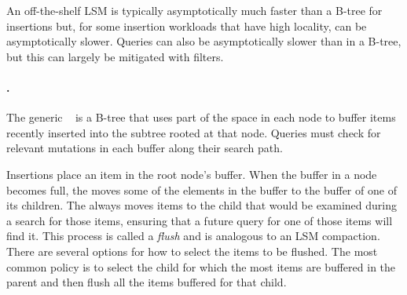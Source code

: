 


An off-the-shelf LSM is typically
asymptotically much faster than a B-tree for insertions but, for some
insertion workloads that have high locality, can be asymptotically slower.  Queries can also be
asymptotically slower than in a B-tree, but this can largely be
mitigated with filters.

\paragraph{\Bets.} The generic \bet~\cite{DBLP:conf/soda/BrodalF03}
is
a B-tree that uses part of the space in each node to buffer items
recently inserted into the subtree rooted at that node.  Queries must
check for relevant mutations in each buffer along their search path.

Insertions place an item in the root node's buffer.  When the buffer
in a node becomes full, the \bet moves some of the
elements in the buffer to the buffer of one of its children.  The \bet
always moves items to the child that would be examined during a search
for those items, ensuring that a future query for one of those items
will find it. This process is called a \emph{flush} and is analogous
to an LSM compaction.  There are several options for how to select the
items to be flushed.  The most common policy is to select the child
for which the most items are buffered in the parent and then flush
all the items buffered for that child.  

